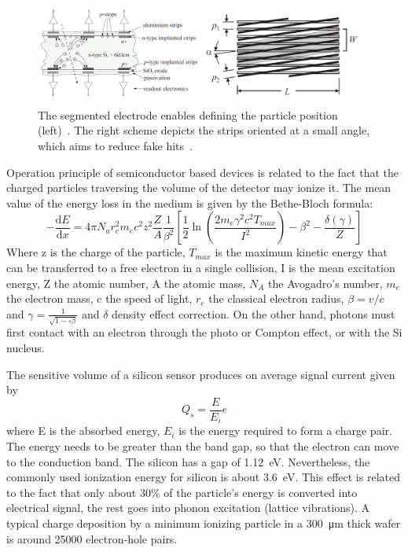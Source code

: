 \begin{figure}[!h]
\centering
\includegraphics[width=0.95\columnwidth]{Chapter2/images/silicons.png}
\caption{The segmented electrode enables defining the particle position (left)~\cite{Sokolov:2006vdx}. The right scheme depicts the strips oriented at a small angle, which aims to reduce fake hits~\cite{Spieler}.}
\label{fig_si}
\end{figure}
\newpage

Operation principle of semiconductor based devices is related to the fact that the charged particles traversing the volume of the detector may ionize it. The mean value of the energy loss in the medium is given by the Bethe-Bloch formula:
\begin{equation}
-\dfrac{\mathrm dE}{\mathrm dx} = 4 \pi N_{a} r_{e}^{2} m_{e} c^{2} z^{2}  \dfrac{Z}{A} \frac{1}{\beta^{2}} \left[ \frac{1}{2}\ln(\frac{2m_{e}\gamma^{2}c^{2} T_{max}}{I^{2}}) - \beta^{2} -  \frac{\delta(\gamma)}{Z}\right]
\end{equation}
Where z is the charge of the particle, $T_{max}$ is the maximum kinetic energy that can be transferred to a free electron in a single collision, I is the mean excitation energy, Z the atomic number, A the atomic mass, $N_{A}$ the Avogadro’s number, $m_{e}$ the electron mass, c the speed of light, $r_{e}$ the classical electron radius, $\beta = v/c$ and $\gamma = \frac{1}{\sqrt{1-\square{\beta}}}$ and $\delta$ density effect correction. On the other hand, photons must first contact with an electron through the photo or Compton effect, or with the Si nucleus. 

The sensitive volume of a silicon sensor produces on average signal current given by 
\begin{equation}
    Q_{s} = \frac{E}{E_{i}}e
\end{equation}
where E is the absorbed energy, $E_{i}$ is the energy required to form a charge pair. The energy needs to be greater than the band gap, so that the electron can move to the conduction band. The silicon has a gap of 1.12~eV. Nevertheless, the commonly used ionization energy for silicon is about 3.6~eV. This effect is related to the fact that only about 30\% of the particle's energy is converted into electrical signal, the rest goes into phonon excitation (lattice vibrations). A typical charge deposition by a minimum ionizing particle in a \SI{300}{\micro\metre} thick wafer is around 25000 electron-hole pairs.

